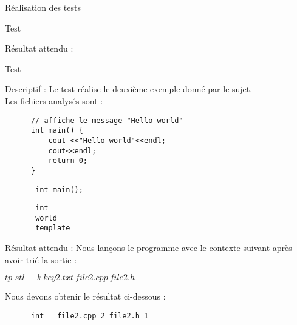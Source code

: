 \documentclass{article}
\begin{document}
\begin{section}{Réalisation des tests}
\begin{subsection}{Test }
\begin{paragraph}{Résultat attendu :}
\begin{listing}[h!]
      \end{listing}
    \end{paragraph}

 \end{subsection}
     
   \newpage      
  \begin{subsection}{Test }
  
    \begin{paragraph}{Descriptif :}
	Le test  réalise le deuxième exemple donné par le sujet.\\ Les fichiers analysés sont : 
      
      \begin{listing}[h!]
      \begin{verbatim}
	  // affiche le message "Hello world"
	  int main() {
	      cout <<"Hello world"<<endl;
	      cout<<endl;
	      return 0;
	  }
      \end{verbatim}
      \end{listing}
      
      \begin{listing}[h!]
	\begin{verbatim}
	   int main();
	\end{verbatim}
      \end{listing}
      
        \begin{listing}[h!]
	\begin{verbatim}
	   int
	   world
	   template
	\end{verbatim}
      \end{listing}
      
    \end{paragraph}
	   
    \begin{paragraph}{Résultat attendu :}
       Nous lançons le programme avec le contexte suivant après avoir trié la sortie :  
       \begin{center}
	\textbf{$tp\_stl\ -k\ key2.txt\ file2.cpp\ file2.h$}
      \end{center}
      
      Nous devons obtenir le résultat ci-dessous : 
      \begin{listing}[h!]
      \begin{verbatim}
	  int	file2.cpp 2	file2.h 1	
      \end{verbatim}
  

\end{listing}
\end{paragraph}
\end{subsection}
\end{section}
\end{document}
